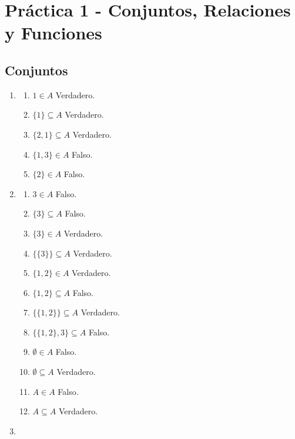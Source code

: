 \section*{Práctica 1 - Conjuntos, Relaciones y Funciones}

\subsection*{Conjuntos}

\begin{enumerate}
\item %
  \begin{multicols}{2}
  \begin{enumerate}
  \item $1 \in A$ Verdadero.
  \item $\{1\} \subseteq A$ Verdadero.
  \item $\{2, 1\} \subseteq A$ Verdadero.
  \item $\{1, 3\} \in A$ Falso.
  \item $\{2\} \in A$ Falso.
  \end{enumerate}
  \end{multicols}
\item %
  \begin{multicols}{2}
  \begin{enumerate}
  \item $3 \in A$ Falso.
  \item $\{3\} \subseteq A$ Falso.
  \item $\{3\} \in A$ Verdadero.
  \item $\{\{3\}\} \subseteq A$ Verdadero.
  \item $\{1, 2\} \in A$ Verdadero.
  \item $\{1, 2\} \subseteq A$ Falso.
  \item $\{\{1, 2\}\} \subseteq A$ Verdadero.
  \item $\{\{1, 2\}, 3\}\subseteq A$ Falso.
  \item $\emptyset \in A$ Falso.
  \item $\emptyset \subseteq A$ Verdadero.
  \item $A \in A$ Falso.
  \item $A \subseteq A$ Verdadero.
  \end{enumerate}
  \end{multicols}
\item %
  \begin{multicols}{2}
  \begin{enumerate}

\end{enumerate}
\end{multicols}
\end{enumerate}
